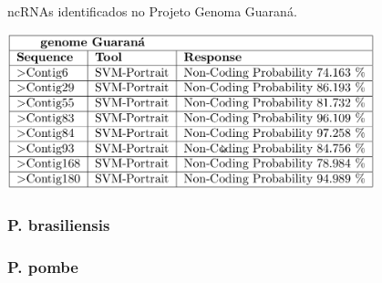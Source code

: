 \begin{table}[htb!]
\caption{ncRNAs identificados no Projeto Genoma Guaraná.} \label{fig:ResulProjGuarana}
\centering
\includegraphics[angle=0,width=0.8\textwidth]{imagens//fig1.JPEG}
\end{table}


\subsubsection{P. brasiliensis} \label{sec:PBrasili}


\subsubsection{P. pombe} \label{sec:SPombe}



%
%
%
%
%
